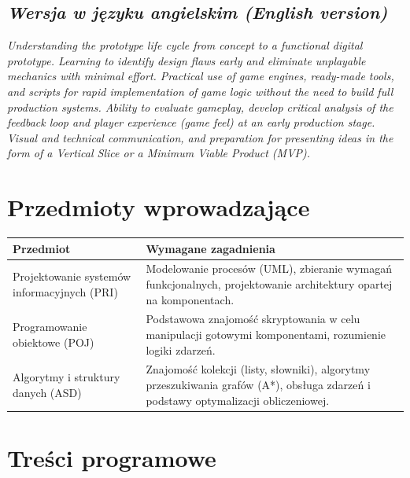 \documentclass[12pt, a4paper]{article}
\newcommand{\thdrule}{\noalign{\global\setlength{\extrarowheight}{0pt}}}
\newcommand{\thdend}{\noalign{\global\setlength{\extrarowheight}{3pt}}}
\begin{document}
\subsection*{\textit{Wersja w języku angielskim (English version)}}

\textit{Understanding the prototype life cycle from concept to a functional digital prototype. Learning to identify design flaws early and eliminate unplayable mechanics with minimal effort. Practical use of game engines, ready-made tools, and scripts for rapid implementation of game logic without the need to build full production systems. Ability to evaluate gameplay, develop critical analysis of the feedback loop and player experience (game feel) at an early production stage. Visual and technical communication, and preparation for presenting ideas in the form of a Vertical Slice or a Minimum Viable Product (MVP).}


\section{Przedmioty wprowadzające}

{\scriptsize
\begin{tabularx}{\textwidth}{m{5cm}Y}
\thdrule\toprule
{} {\color{white}\textbf{Przedmiot}} & {\color{white}\textbf{Wymagane zagadnienia}} \\
\midrule\thdend
   Projektowanie systemów informacyjnych (PRI) & Modelowanie procesów (UML), zbieranie wymagań funkcjonalnych, projektowanie architektury opartej na komponentach. \\
   Programowanie obiektowe	(POJ) & Podstawowa znajomość skryptowania w celu manipulacji gotowymi komponentami, rozumienie logiki zdarzeń. \\
   Algorytmy i struktury danych (ASD) & Znajomość kolekcji (listy, słowniki), algorytmy przeszukiwania grafów (A*), obsługa zdarzeń i podstawy optymalizacji obliczeniowej. \\
\bottomrule
\end{tabularx}}

\section{Treści programowe}
\end{document}
